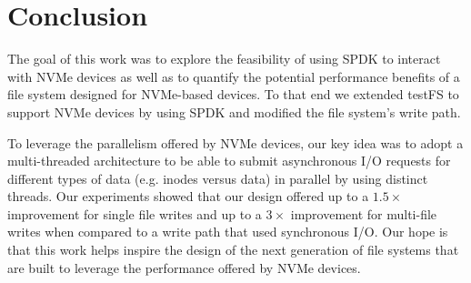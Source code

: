 \section{Conclusion}
The goal of this work was to explore the feasibility of using SPDK to interact
with NVMe devices as well as to quantify the potential performance benefits of
a file system designed for NVMe-based devices. To that end we extended testFS
to support NVMe devices by using SPDK and modified the file system's write
path.

To leverage the parallelism offered by NVMe devices, our key idea was to adopt
a multi-threaded architecture to be able to submit asynchronous I/O requests
for different types of data (e.g. inodes versus data) in parallel by using
distinct threads. Our experiments showed that our design offered up to a
$1.5\times$ improvement for single file writes and up to a $3\times$
improvement for multi-file writes when compared to a write path that used
synchronous I/O. Our hope is that this work helps inspire the design of the
next generation of file systems that are built to leverage the performance
offered by NVMe devices.
